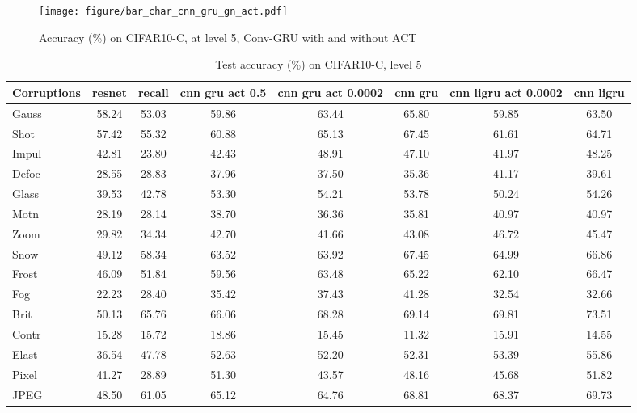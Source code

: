 \begin{figure*}[htbp]
    \centering
    \texttt{[image: figure/bar\_char\_cnn\_gru\_gn\_act.pdf]}
        \caption{Accuracy (\%) on CIFAR10-C, at level 5, Conv-GRU with and without ACT}
        \label{fig:bar_chart_act}
\end{figure*}

\begin{table*}[t]
\centering
\caption{Test accuracy (\%) on CIFAR10-C, level 5}
\begin{tabular}{l|c|c|c|c|c|c|c}
\toprule
Corruptions & resnet & recall & cnn gru act 0.5 & cnn gru act 0.0002 & cnn gru & cnn ligru act 0.0002 & cnn ligru \\
\midrule
Gauss & 58.24 & 53.03 & 59.86 & 63.44 & 65.80 & 59.85 & 63.50 \\
Shot & 57.42 & 55.32 & 60.88 & 65.13 & 67.45 & 61.61 & 64.71 \\
Impul & 42.81 & 23.80 & 42.43 & 48.91 & 47.10 & 41.97 & 48.25 \\
Defoc & 28.55 & 28.83 & 37.96 & 37.50 & 35.36 & 41.17 & 39.61 \\
Glass & 39.53 & 42.78 & 53.30 & 54.21 & 53.78 & 50.24 & 54.26 \\
Motn & 28.19 & 28.14 & 38.70 & 36.36 & 35.81 & 40.97 & 40.97 \\
Zoom & 29.82 & 34.34 & 42.70 & 41.66 & 43.08 & 46.72 & 45.47 \\
Snow & 49.12 & 58.34 & 63.52 & 63.92 & 67.45 & 64.99 & 66.86 \\
Frost & 46.09 & 51.84 & 59.56 & 63.48 & 65.22 & 62.10 & 66.47 \\
Fog & 22.23 & 28.40 & 35.42 & 37.43 & 41.28 & 32.54 & 32.66 \\
Brit & 50.13 & 65.76 & 66.06 & 68.28 & 69.14 & 69.81 & 73.51 \\
Contr & 15.28 & 15.72 & 18.86 & 15.45 & 11.32 & 15.91 & 14.55 \\
Elast & 36.54 & 47.78 & 52.63 & 52.20 & 52.31 & 53.39 & 55.86 \\
Pixel & 41.27 & 28.89 & 51.30 & 43.57 & 48.16 & 45.68 & 51.82 \\
JPEG & 48.50 & 61.05 & 65.12 & 64.76 & 68.81 & 68.37 & 69.73 \\
\bottomrule
\end{tabular}
\label{tab:acc_all}
\end{table*}

